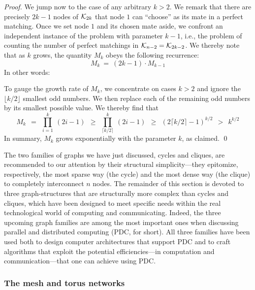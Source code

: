 \begin{proof}
We jump now to the case of any arbitrary $k > 2$.  We remark that
there are precisely $2k-1$ nodes of $\mbox{$\cal K$}_{2k}$ that node $1$ can
``choose'' as its mate in a perfect matching.  Once we set node $1$
and its chosen mate aside, we confront an independent instance of the
problem with parameter $k-1$, i.e., the problem of counting the number
of perfect matchings in $\mbox{$\cal K$}_{n-2} = \mbox{$\cal K$}_{2k-2}$.  We thereby note that
as $k$ grows, the quantity $M_k$ obeys the following recurrence:
\[ M_k \ = \ (2k-1) \cdot M_{k-1} \]
In other words:

\hspace*{.25in}{\em $M_k$ is the product of the first $k$ odd numbers.}

\noindent
To gauge the growth rate of $M_k$, we concentrate on cases $k > 2$ and
ignore the $\lfloor k/2 \rfloor$ smallest odd numbers.  We then
replace each of the remaining odd numbers by its smallest possible
value.  We thereby find that
\[
M_k \ \ =    \ \ \prod_{i=1}^k \ (2i-1)
    \ \ \geq \ \ \prod_{\lceil k/2 \rceil}^k \ (2i-1)
    \ \ \geq \ \ \left( 2 \lceil k/2 \rceil -1 \right)^{k/2}
    \ \ >    \ \ k^{k/2}
\]
In summary, $M_k$ grows exponentially with the parameter $k$, as claimed.
\qed
\end{proof}


\bigskip

The two families of graphs we have just discussed, cycles and cliques,
are recommended to our attention by their structural simplicity---they
epitomize, respectively, the most sparse way (the cycle) and the most
dense way (the clique) to completely interconnect $n$ nodes.  The
remainder of this section is devoted to three graph-structures that
are structurally more complex than cycles and cliques, which have been
designed to meet specific needs within the real technological world of
computing and communicating.  Indeed, the three upcoming graph
families are among the most important ones when discussing parallel
and distributed computing (PDC, for short).  All three families have
been used both to design computer architectures that support PDC and
to craft algorithms that exploit the potential efficiencies---in
computation and communication---that one can achieve using PDC.

\subsubsection{The mesh and torus networks}
\label{sec:mesh-torus}

